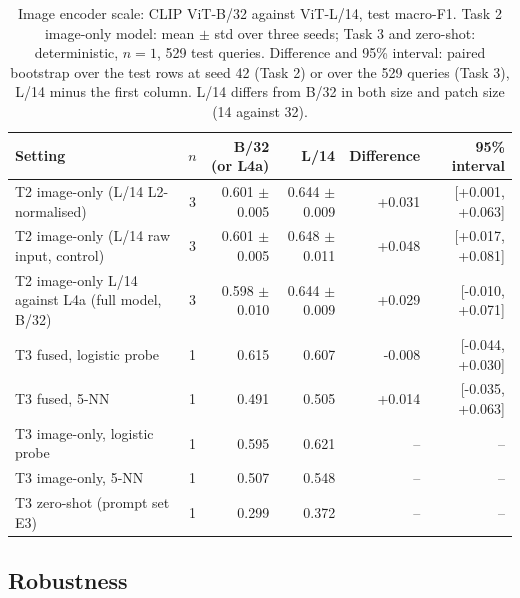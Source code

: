 \begin{table}[t]
\centering
\footnotesize
\caption{Image encoder scale: CLIP ViT-B/32 against ViT-L/14, test macro-F1. Task 2 image-only model: mean $\pm$ std over three seeds; Task 3 and zero-shot: deterministic, $n=1$, 529 test queries. Difference and 95\% interval: paired bootstrap over the test rows at seed 42 (Task 2) or over the 529 queries (Task 3), L/14 minus the first column. L/14 differs from B/32 in both size and patch size (14 against 32).}
\label{tab:b_scale}
\begin{tabular}{lcrrrr}
\toprule
Setting & $n$ & B/32 (or L4a) & L/14 & Difference & 95\% interval \\
\midrule
T2 image-only (L/14 L2-normalised) & 3 & 0.601 $\pm$ 0.005 & 0.644 $\pm$ 0.009 & +0.031 & [+0.001, +0.063] \\
T2 image-only (L/14 raw input, control) & 3 & 0.601 $\pm$ 0.005 & 0.648 $\pm$ 0.011 & +0.048 & [+0.017, +0.081] \\
T2 image-only L/14 against L4a (full model, B/32) & 3 & 0.598 $\pm$ 0.010 & 0.644 $\pm$ 0.009 & +0.029 & [-0.010, +0.071] \\
T3 fused, logistic probe & 1 & 0.615 & 0.607 & -0.008 & [-0.044, +0.030] \\
T3 fused, 5-NN & 1 & 0.491 & 0.505 & +0.014 & [-0.035, +0.063] \\
T3 image-only, logistic probe & 1 & 0.595 & 0.621 & -- & -- \\
T3 image-only, 5-NN & 1 & 0.507 & 0.548 & -- & -- \\
T3 zero-shot (prompt set E3) & 1 & 0.299 & 0.372 & -- & -- \\
\bottomrule
\end{tabular}
\end{table}
\subsection{Robustness}
\label{sec:ablation-robustness}

